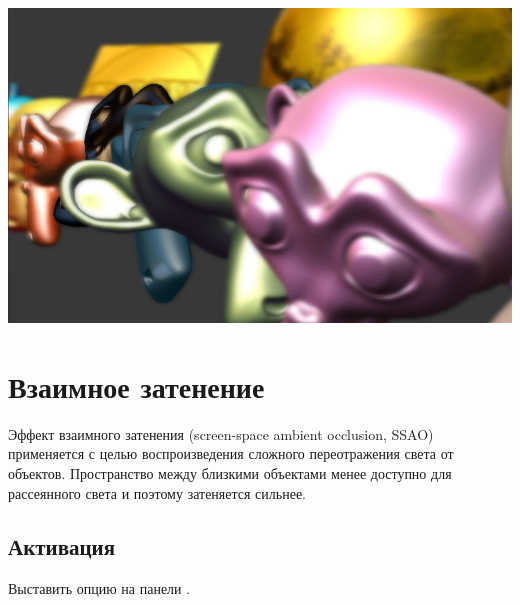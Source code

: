 \documentclass[a4paper,12pt,oneside]{sphinxmanual}
\begin{document}
{\hfill\includegraphics[width=1.000\linewidth]{dof.jpg}\hfill}

\begin{DUlineblock}{0em}
\item[] 
\end{DUlineblock}


\section{Взаимное затенение}
\label{postprocessing_effects:index-2}\label{postprocessing_effects:ssao}\label{postprocessing_effects:id8}
Эффект взаимного затенения (screen-space ambient occlusion, SSAO) применяется с целью воспроизведения сложного переотражения света от объектов. Пространство между близкими объектами менее доступно для рассеянного света и поэтому затеняется сильнее.


\subsection{Активация}
\label{postprocessing_effects:id9}
Выставить опцию  на панели .
\end{document}
